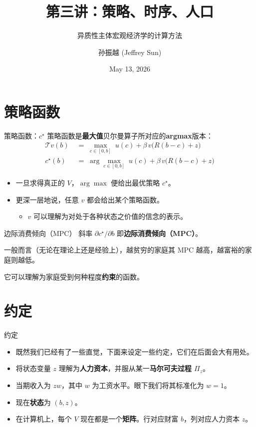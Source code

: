 \documentclass[10pt,aspectratio=169]{beamer}
\title{第三讲：策略、时序、人口}
\subtitle{异质性主体宏观经济学的计算方法}
\author{孙振越 (Jeffrey Sun)}
\institute{多伦多大学}
\date{May 13, 2026}
\begin{document}
\maketitle

\section{策略函数}

\begin{frame}{策略函数：$c^\star$}
  策略函数是\textbf{最大值}贝尔曼算子所对应的\textbf{argmax}版本：
  \begin{align*}
    \mathcal{T}v(b)        &\;=\; \max_{c \in [0, b]} \; u(c) + \beta \, v\!\big(R(b - c) + z\big) \tag{Bellman Operator} \\[0.4em]
    c^\star(b)  &\;=\; \arg\max_{c \in [0, b]} \; u(c) + \beta \, v\!\big(R(b - c) + z\big) \tag{Policy Function}
  \end{align*}
  \begin{itemize}
    \item 一旦求得真正的 $V$，$\arg\max$ 便给出最优策略 $c^\star$。
    \item 更深一层地说，任意 $v$ 都会给出某个策略函数。
    \begin{itemize}
      \item $v$ 可以理解为对处于各种状态之价值的信念的表示。
    \end{itemize}
  \end{itemize}
\end{frame}

\begin{frame}{边际消费倾向（MPC）}
  斜率 $\partial c^\star / \partial b$ 即\textbf{边际消费倾向（MPC）}。

  一般而言（无论在理论上还是经验上），越贫穷的家庭其 MPC 越高，越富裕的家庭则越低。

  它可以理解为家庭受到何种程度\textbf{约束}的函数。
\end{frame}

\section{约定}

\begin{frame}{约定}
  \begin{itemize}
    \item 既然我们已经有了一些直觉，下面来设定一些约定，它们在后面会大有用处。
    \item 将状态变量 $z$ 理解为\textbf{人力资本}，并服从某一\textbf{马尔可夫过程 $\Pi_z$}。
    \item 当期收入为 $zw$，其中 $w$ 为工资水平。眼下我们将其标准化为 $w = 1$。
    \item 现在\textbf{状态}为 $(b, z)$。
    \item 在计算机上，每个 $V$ 现在都是一个\textbf{矩阵}。行对应财富 $b$，列对应人力资本 $z$。
  \end{itemize}
\end{frame}
\end{document}
